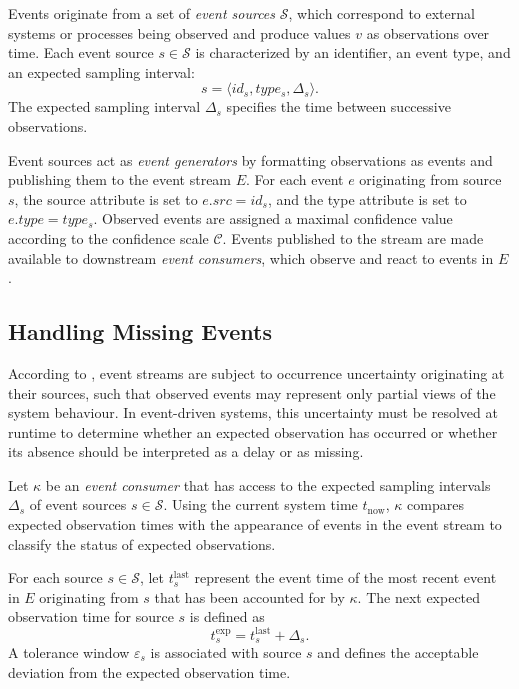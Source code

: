 Events originate from a set of \emph{event sources} $\mathcal{S}$, which correspond to external systems or processes being observed and produce values $v$ as observations over time. Each event source $s \in \mathcal{S}$ is characterized by an identifier, an event type, and an expected sampling interval:
\begin{equation}
s = \langle id_s, type_s, \Delta_s \rangle .
\end{equation}
\noindent
The expected sampling interval $\Delta_s$ specifies the time between successive observations.

Event sources act as \emph{event generators} by formatting observations as events and publishing them to the event stream $E$. For each event $e$ originating from source $s$, the source attribute is set to $e.src = id_s$, and the type attribute is set to $e.type = type_s$. Observed events are assigned a maximal confidence value according to the confidence scale $\mathcal{C}$.
Events published to the stream are made available to downstream \emph{event consumers}, which observe and react to events in $E$.


\subsection{Handling Missing Events}
\label{sec:scheduling-missing}

According to \citet{wasserkrug2006taxonomy}, event streams are subject to occurrence uncertainty originating at their sources, such that observed events may represent only partial views of the system behaviour. In event-driven systems, this uncertainty must be resolved at runtime to determine whether an expected observation has occurred or whether its absence should be interpreted as a delay or as missing.

Let $\kappa$ be an \emph{event consumer} that has access to the expected sampling intervals $\Delta_s$ of event sources $s \in \mathcal{S}$. Using the current system time $t_{\mathrm{now}}$, $\kappa$ compares expected observation times with the appearance of events in the event stream to classify the status of expected observations.

For each source $s \in \mathcal{S}$, let $t^{\mathrm{last}}_s$ represent the event time of the most recent event in $E$ originating from $s$ that has been accounted for by $\kappa$. The next expected observation time for source $s$ is defined as
\begin{equation}
t^{\mathrm{exp}}_s = t^{\mathrm{last}}_s + \Delta_s .
\end{equation}
A tolerance window $\varepsilon_s$ is associated with source $s$ and defines the acceptable deviation from the expected observation time.

